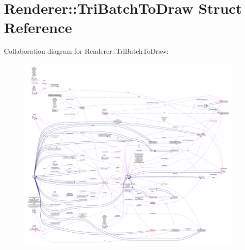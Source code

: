 \hypertarget{structRenderer_1_1TriBatchToDraw}{}\section{Renderer\+:\+:Tri\+Batch\+To\+Draw Struct Reference}
\label{structRenderer_1_1TriBatchToDraw}


Collaboration diagram for Renderer\+:\+:Tri\+Batch\+To\+Draw\+:
\nopagebreak
\begin{figure}[H]
\begin{center}
\leavevmode
\includegraphics[width=350pt]{structRenderer_1_1TriBatchToDraw__coll__graph}
\end{center}
\end{figure}
